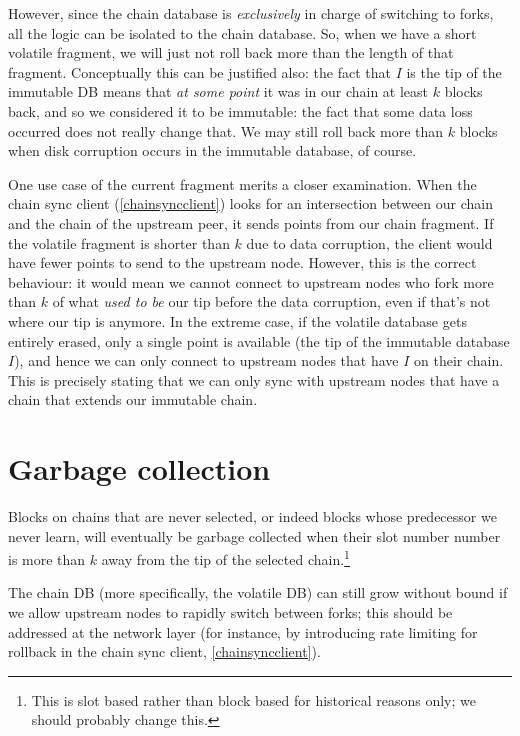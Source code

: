 However, since the chain database is \emph{exclusively} in charge of switching
to forks, all the logic can be isolated to the chain database. So, when we have
a short volatile fragment, we will just not roll back more than the length of
that fragment. Conceptually this can be justified also: the fact that $I$ is the
tip of the immutable DB means that \emph{at some point} it was in our chain at
least $k$ blocks back, and so we considered it to be immutable: the fact that
some data loss occurred does not really change that. We may still roll back more
than $k$ blocks when disk corruption occurs in the immutable database, of
course.

One use case of the current fragment merits a closer examination. When the chain
sync client (\cref{chainsyncclient}) looks for an intersection between our chain
and the chain of the upstream peer, it sends points from our chain fragment. If
the volatile fragment is shorter than $k$ due to data corruption, the client
would have fewer points to send to the upstream node. However, this is the
correct behaviour: it would mean we cannot connect to upstream nodes who fork
more than $k$ of what \emph{used to be} our tip before the data corruption, even
if that's not where our tip is anymore. In the extreme case, if the volatile
database gets entirely erased, only a single point is available (the tip of the
immutable database $I$), and hence we can only connect to upstream nodes that
have $I$ on their chain.  This is precisely stating that we can only sync with
upstream nodes that have a chain that extends our immutable chain.

\section{Garbage collection}
\label{chaindb:gc}

Blocks on chains that are never selected, or indeed blocks whose
predecessor we never learn, will eventually be garbage collected when their
slot number number is more than $k$ away from the tip of the selected chain.\footnote{This is slot based rather than block based for historical
reasons only; we should probably change this.}

\begin{bug}
The chain DB (more specifically, the volatile DB) can still grow without bound
if we allow upstream nodes to rapidly switch between forks; this should be
addressed at the network layer (for instance, by introducing rate limiting for
rollback in the chain sync client, \cref{chainsyncclient}).
\end{bug}

